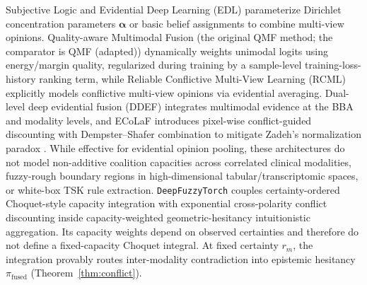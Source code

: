 \documentclass[10pt,twocolumn]{article}
\begin{document}
Subjective Logic and Evidential Deep Learning (EDL)
\cite{sensoy2018evidential,han2022trusted,shao2024dual,xu2024reliable} parameterize Dirichlet
concentration parameters
$\bm{\alpha}$ or basic belief assignments to combine multi-view opinions. Quality-aware
Multimodal Fusion (the original QMF method; the comparator is QMF (adapted))
\cite{zhang2023provable} dynamically weights unimodal logits using energy/margin quality,
regularized during training by a sample-level training-loss-history ranking term, while
Reliable Conflictive Multi-View Learning
(RCML) \cite{xu2024reliable} explicitly models conflictive multi-view opinions via evidential
averaging. Dual-level deep evidential fusion (DDEF) \cite{shao2024dual} integrates multimodal
evidence at the BBA and modality levels, and ECoLaF \cite{deregnaucourt2025ecolaf} introduces
pixel-wise conflict-guided discounting with Dempster--Shafer combination to mitigate Zadeh's
normalization paradox \cite{zadeh1986simple}. While effective for evidential opinion pooling,
these architectures do not model non-additive coalition capacities across correlated clinical
modalities, fuzzy-rough boundary regions in high-dimensional tabular/transcriptomic spaces, or
white-box TSK rule extraction. \texttt{DeepFuzzyTorch} couples certainty-ordered
Choquet-style capacity integration \cite{choquet1954theory,xu2010choquet} with exponential
cross-polarity conflict discounting inside capacity-weighted geometric-hesitancy intuitionistic
aggregation. Its capacity weights depend on observed certainties and therefore do not define a
fixed-capacity Choquet integral. At fixed certainty $r_m$, the integration provably routes
inter-modality contradiction into epistemic hesitancy $\pi_{\text{fused}}$
(Theorem~\ref{thm:conflict}).
\end{document}
